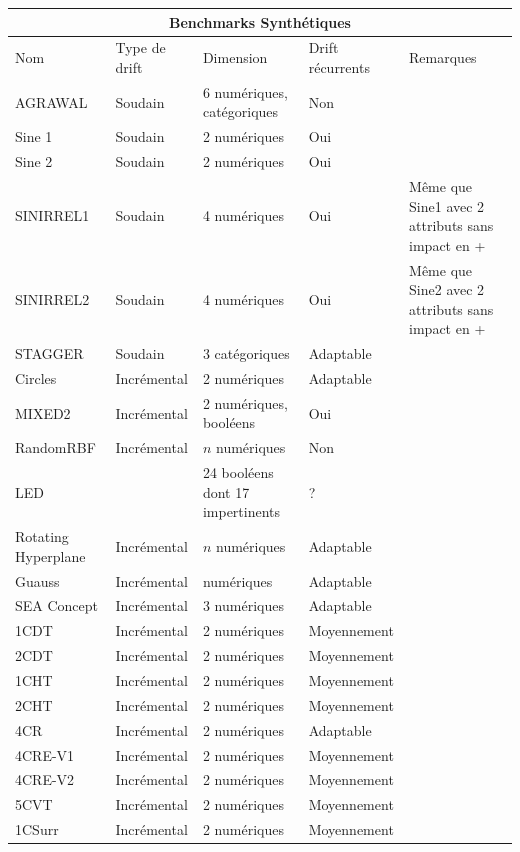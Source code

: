 \documentclass[11pt,a4paper]{report}
\begin{document}
\begin{tabular}{ |p{3cm}||p{3cm}|p{3cm}|p{3cm}|p{3cm}|  }

 \hline

 \multicolumn{5}{|c|}{Benchmarks Synthétiques} \\
 \hline
 Nom &Type de drift&Dimension & Drift récurrents & Remarques\\
 \hline 
 AGRAWAL   & Soudain    & 6 numériques, \newline 3 catégoriques &   Non & \\
 Sine 1 &  Soudain & 2 numériques & Oui & \\
 Sine 2 & Soudain & 2 numériques &  Oui & \\
 SINIRREL1 & Soudain & 4 numériques & Oui & Même que Sine1 avec 2 attributs sans impact en +\\
  SINIRREL2 & Soudain & 4 numériques & Oui & Même que Sine2 avec 2 attributs sans impact en +\\
 STAGGER    & Soudain & 3 catégoriques & Adaptable &\\
 Circles		&   Incrémental  & 2 numériques & Adaptable&\\
 MIXED2 &   Incrémental  & 2 numériques, \newline 2 booléens& Oui& \\
 RandomRBF &  Incrémental & $n$ numériques & Non& \\
 LED & & 24 booléens dont 17 impertinents & ?& \\
 Rotating Hyperplane  & Incrémental & $n$ numériques & Adaptable& \\
 Guauss & Incrémental & numériques & Adaptable& \\
 SEA Concept & Incrémental & 3 numériques & Adaptable & \\
 1CDT & Incrémental & 2 numériques & Moyennement  & \\
2CDT & Incrémental& 2 numériques& Moyennement  & \\
1CHT & Incrémental& 2 numériques& Moyennement  &  \\
2CHT & Incrémental& 2 numériques& Moyennement  &   \\
4CR & Incrémental& 2 numériques & Adaptable  &  \\
4CRE-V1& Incrémental & 2 numériques &  Moyennement  & \\
4CRE-V2 & Incrémental& 2 numériques & Moyennement  & \\
5CVT & Incrémental& 2 numériques & Moyennement  & \\
1CSurr & Incrémental& 2 numériques& Moyennement  & \\

\end{tabular}
\end{document}
